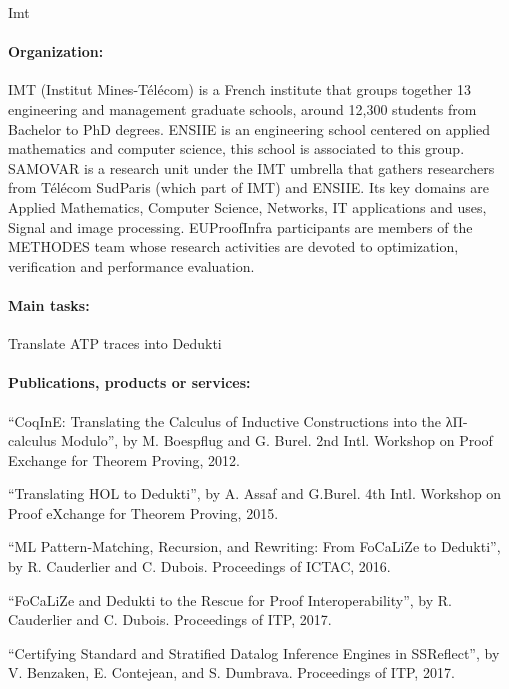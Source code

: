 \begin{sitedescription}{Imt}


\paragraph*{Organization:}
IMT (Institut Mines-T\'el\'ecom) is a French institute that groups together 13 engineering and management graduate schools, around 12,300 students from Bachelor to PhD degrees.
ENSIIE is an engineering school centered on applied mathematics and computer science, this school is associated to this group. SAMOVAR is a research unit under the IMT umbrella that gathers researchers from T\'el\'ecom SudParis (which part of IMT) and ENSIIE. Its key domains are Applied Mathematics,  Computer Science, Networks, IT applications and uses, Signal and image processing. EUProofInfra participants are members of the METHODES team whose research activities are devoted to
optimization, verification and performance evaluation.

\paragraph*{Main tasks:}

\begin{compactitem}
\item Translate ATP traces into Dedukti 


\end{compactitem}

\paragraph*{Publications, products or services:}

\begin{compactitem}
 \item ``CoqInE: Translating the Calculus of Inductive Constructions into the λΠ-calculus Modulo'', by M. Boespflug and G. Burel. 2nd Intl. Workshop on Proof Exchange for Theorem Proving, 2012.
 \item ``Translating HOL to Dedukti'', by A. Assaf and G.Burel. 4th Intl. Workshop on Proof eXchange for Theorem Proving, 2015.
 \item ``ML Pattern-Matching, Recursion, and Rewriting: From FoCaLiZe to Dedukti'', by R. Cauderlier and C. Dubois. Proceedings of ICTAC, 2016.
 \item ``FoCaLiZe and Dedukti to the Rescue for Proof Interoperability'', by R. Cauderlier and C. Dubois. Proceedings of ITP, 2017.
 \item ``Certifying Standard and Stratified Datalog Inference Engines in SSReflect'', by V. Benzaken, E. Contejean, and S. Dumbrava. Proceedings of ITP, 2017.
\end{compactitem}


\end{sitedescription}
